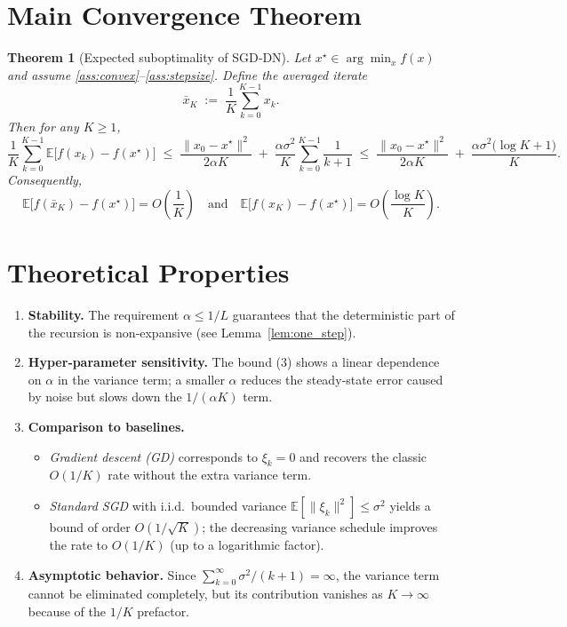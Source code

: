 \documentclass{article}
\newtheorem{theorem}{Theorem}
\begin{document}
\section*{Main Convergence Theorem}
\begin{theorem}[Expected suboptimality of SGD‑DN]\label{thm:main}
Let $x^{\star}\in\arg\min_{x}f(x)$ and assume \ref{ass:convex}–\ref{ass:stepsize}.  Define the averaged iterate
\[
\bar x_{K}\;:=\;\frac{1}{K}\sum_{k=0}^{K-1}x_{k}.
\]
Then for any $K\ge1$,
\[
\frac{1}{K}\sum_{k=0}^{K-1}\mathbb{E}\!\bigl[f(x_{k})-f(x^{\star})\bigr]
\;\le\;
\frac{\|x_{0}-x^{\star}\|^{2}}{2\alpha K}
\;+\;
\frac{\alpha\sigma^{2}}{K}\sum_{k=0}^{K-1}\frac{1}{k+1}
\;\le\;
\frac{\|x_{0}-x^{\star}\|^{2}}{2\alpha K}
\;+\;
\frac{\alpha\sigma^{2}\bigl(\log K+1\bigr)}{K}.
\tag{3}
\]
Consequently,
\[
\mathbb{E}\!\bigl[f(\bar x_{K})-f(x^{\star})\bigr]=O\!\left(\frac{1}{K}\right)
\quad\text{and}\quad
\mathbb{E}\!\bigl[f(x_{K})-f(x^{\star})\bigr]=O\!\left(\frac{\log K}{K}\right).
\]
\end{theorem}

\section*{Theoretical Properties}
\begin{enumerate}[label=\arabic*.]
\item \textbf{Stability.} The requirement $\alpha\le1/L$ guarantees that the deterministic part of the recursion is non‑expansive (see Lemma~\ref{lem:one_step}).
\item \textbf{Hyper‑parameter sensitivity.} The bound (3) shows a linear dependence on $\alpha$ in the variance term; a smaller $\alpha$ reduces the steady‑state error caused by noise but slows down the $1/(\alpha K)$ term.
\item \textbf{Comparison to baselines.}
    \begin{itemize}
        \item \textit{Gradient descent (GD)} corresponds to $\xi_{k}=0$ and recovers the classic $O(1/K)$ rate without the extra variance term.
        \item \textit{Standard SGD} with i.i.d.\ bounded variance $\mathbb{E}\!\left[\|\xi_{k}\|^{2}\right]\le\sigma^{2}$ yields a bound of order $O(1/\sqrt{K})$; the decreasing variance schedule improves the rate to $O(1/K)$ (up to a logarithmic factor).
    \end{itemize}
\item \textbf{Asymptotic behavior.} Since $\sum_{k=0}^{\infty}\sigma^{2}/(k+1)=\infty$, the variance term cannot be eliminated completely, but its contribution vanishes as $K\to\infty$ because of the $1/K$ prefactor.
\end{enumerate}
\end{document}
